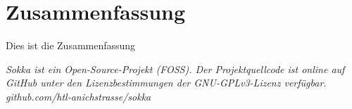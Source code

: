 \section*{Zusammenfassung}

Dies ist die Zusammenfassung

\textit{Sokka ist ein Open-Source-Projekt (FOSS). Der Projektquellcode ist online auf GitHub unter den Lizenzbestimmungen der GNU-GPLv3-Lizenz verfügbar.\\github.com/htl-anichstrasse/sokka}

\newpage